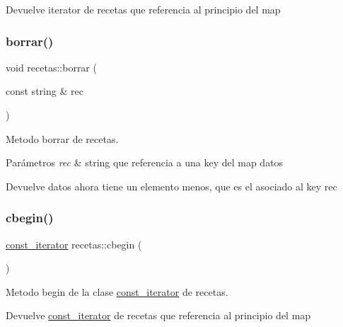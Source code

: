 \begin{DoxyReturn}{Devuelve}
iterator de recetas que referencia al principio del map 
\end{DoxyReturn}
\mbox{\label{classrecetas_a52f721a2505cd731718bec3c2231cce7}} 
\subsubsection{\texorpdfstring{borrar()}{borrar()}}
{\footnotesize\ttfamily void recetas\+::borrar (\begin{DoxyParamCaption}\item[{const string \&}]{rec }\end{DoxyParamCaption})}



Metodo borrar de recetas. 


\begin{DoxyParams}{Parámetros}
{\em rec} & string que referencia a una key del map datos \\
\hline
\end{DoxyParams}
\begin{DoxyReturn}{Devuelve}
datos ahora tiene un elemento menos, que es el asociado al key rec 
\end{DoxyReturn}
\mbox{\label{classrecetas_affc2a9e77966eea6ad67b84fc60c6dff}} 
\subsubsection{\texorpdfstring{cbegin()}{cbegin()}}
{\footnotesize\ttfamily \hyperlink{classrecetas_1_1const__iterator}{const\+\_\+iterator} recetas\+::cbegin (\begin{DoxyParamCaption}{ }\end{DoxyParamCaption})\hspace{0.3cm}{\ttfamily [inline]}}



Metodo begin de la clase \hyperlink{classrecetas_1_1const__iterator}{const\+\_\+iterator} de recetas. 

\begin{DoxyReturn}{Devuelve}
\hyperlink{classrecetas_1_1const__iterator}{const\+\_\+iterator} de recetas que referencia al principio del map 
\end{DoxyReturn}
\mbox{\label{classrecetas_a4eab868b8c3259a163d6c3d3e6424b39}} 
